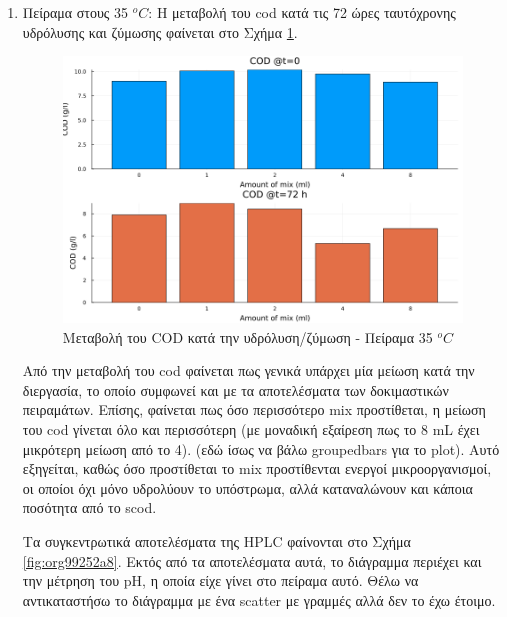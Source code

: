 \documentclass[11pt]{report}
\begin{document}
\begin{enumerate}
\item Πείραμα στους 35 \(^oC\):
\label{sec:org21736ec}
Η μεταβολή του \acrshort{cod} κατά τις 72 ώρες ταυτόχρονης υδρόλυσης και ζύμωσης φαίνεται στο Σχήμα \ref{fig:org2313470}.

\begin{figure}[htbp]
\centering
\includegraphics[width=.9\linewidth]{../plots/10_11/cod_bar_10_11.png}
\caption{\label{fig:org2313470}Μεταβολή του COD κατά την υδρόλυση/ζύμωση - Πείραμα 35 \(^oC\)}
\end{figure}

Από την μεταβολή του \acrshort{cod} φαίνεται πως γενικά υπάρχει μία μείωση κατά την διεργασία, το οποίο συμφωνεί και με τα αποτελέσματα των δοκιμαστικών πειραμάτων. Επίσης, φαίνεται πως όσο περισσότερο \acrshort{mix} προστίθεται, η μείωση του \acrshort{cod} γίνεται όλο και περισσότερη (με μοναδική εξαίρεση πως το 8 mL έχει μικρότερη μείωση από το 4). (εδώ ίσως να βάλω groupedbars για το plot). Αυτό εξηγείται, καθώς όσο προστίθεται το \acrshort{mix} προστίθενται ενεργοί μικροοργανισμοί, οι οποίοι όχι μόνο υδρολύουν το υπόστρωμα, αλλά καταναλώνουν και κάποια ποσότητα από το \acrfull{scod}.

Τα συγκεντρωτικά αποτελέσματα της HPLC φαίνονται στο Σχήμα \ref{fig:org99252a8}. Εκτός από τα αποτελέσματα αυτά, το διάγραμμα περιέχει και την μέτρηση του pH, η οποία είχε γίνει στο πείραμα αυτό. Θέλω να αντικαταστήσω το διάγραμμα με ένα scatter με γραμμές αλλά δεν το έχω έτοιμο.


\end{enumerate}
\end{document}
